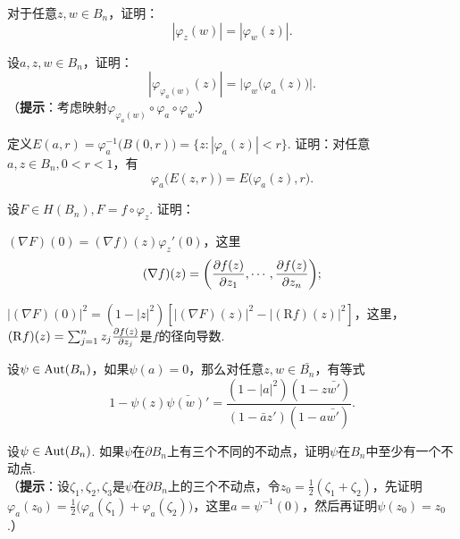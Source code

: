 \begin{xiti}
  \item 对于任意$z,w\in B_n$，证明：
     \[
       |\varphi_z(w)| = |\varphi_w(z)|.
     \]
  \item 设$a,z,w\in B_n$，证明：
     \[
       |\varphi_{\varphi_a(w)}(z)| = \big|\varphi_w\big(\varphi_a(z)\big)\big|.
     \]
    （\textbf{提示}：考虑映射$\varphi_{\varphi_a(w)}\circ\varphi_a\circ\varphi_w$.）
  \item 定义$E(a,r)=\varphi_a^{-1}\big(B(0,r)\big)=\{z:|\varphi_a(z)|<r\}$. 证明：对任意$a,z\in B_n,0<r<1$，有
     \[
       \varphi_a\big(E(z,r)\big) = E\big(\varphi_a(z),r\big).
     \]
  \item 设$F\in H(B_n),F=f\circ\varphi_z$. 证明：
    \begin{enuma}
      \item $(\nabla F)(0)=(\nabla f)(z)\varphi_z'(0)$，这里
         \[
           (\nabla f)(z) = \bigg(\frac{\partial f(z)}{\partial z_1},\cdots,\frac{\partial f(z)}{\partial z_n}\bigg);
         \]
      \item $|(\nabla F)(0)|^2=(1-|z|^2)[|(\nabla F)(z)|^2-|(\mathrm Rf)(z)|^2]$，这里，$(\mathrm Rf)(z)=\sum_{j=1}^nz_j\frac{\partial f(z)}{\partial z_j}$是$f$的径向导数.
    \end{enuma}
  \item 设$\psi\in\operatorname{Aut}(B_n)$，如果$\psi(a)=0$，那么对任意$z,w\in\bar{B_n}$，有等式
    \[
      1-\psi(z)\bar{\psi(w)'} = \frac{(1-|a|^2)(1-z\bar{w'})}
      {(1-\bar az')(1-a\bar {w'})}.
    \]
  \item 设$\psi\in\operatorname{Aut}(B_n)$. 如果$\psi$在$\partial B_n$上有三个不同的不动点，证明$\psi$在$B_n$中至少有一个不动点.\\
     （\textbf{提示}：设$\zeta_1,\zeta_2,\zeta_3$是$\psi$在$\partial B_n$上的三个不动点，令$z_0=\frac12(\zeta_1+\zeta_2)$，先证明$\varphi_a(z_0)=\frac12\big(\varphi_a(\zeta_1)+\varphi_a(\zeta_2)\big)$，这里$a=\psi^{-1}(0)$，然后再证明$\psi(z_0)=z_0$.）
\end{xiti}
